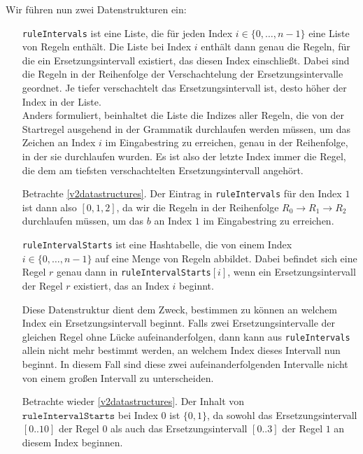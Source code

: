 Wir führen nun zwei Datenstrukturen ein: 
\begin{itemize}[leftmargin=10em]
	\item[\texttt{ruleIntervals}] ist eine Liste, die für jeden Index $i \in \{0, \dots, n - 1\}$ eine Liste von Regeln enthält. Die Liste bei Index $i$ enthält dann genau die Regeln, für die ein Ersetzungsintervall existiert, das diesen Index einschließt. Dabei sind die Regeln in der Reihenfolge der Verschachtelung der Ersetzungsintervalle geordnet. Je tiefer verschachtelt das Ersetzungsintervall ist, desto höher der Index in der Liste.\\ 
	Anders formuliert, beinhaltet die Liste die Indizes aller Regeln, die von der Startregel ausgehend in der Grammatik durchlaufen werden müssen, um das Zeichen an Index $i$ im Eingabestring zu erreichen, genau in der Reihenfolge, in der sie durchlaufen wurden. Es ist also der letzte Index immer die Regel, die dem am tiefsten verschachtelten Ersetzungsintervall angehört. 
	
	Betrachte \autoref{v2datastructures}. Der Eintrag in \texttt{ruleIntervals} für den Index $1$ ist dann also $[0, 1, 2]$, da wir die Regeln in der Reihenfolge $R_0 \rightarrow R_1 \rightarrow R_2$ durchlaufen müssen, um das $b$ an Index $1$ im Eingabestring zu erreichen.
	
	\item[\texttt{ruleIntervalStarts}] ist eine Hashtabelle, die von einem Index $i \in \{0, \dots, n - 1\}$ auf eine Menge von Regeln abbildet. Dabei befindet sich eine Regel $r$ genau dann in \texttt{ruleIntervalStarts}$[i]$, wenn ein Ersetzungsintervall der Regel $r$ existiert, das an Index $i$ beginnt.
	
	Diese Datenstruktur dient dem Zweck, bestimmen zu können an welchem Index ein Ersetzungsintervall beginnt. Falls zwei Ersetzungsintervalle der gleichen Regel ohne Lücke aufeinanderfolgen, dann kann aus \texttt{ruleIntervals} allein nicht mehr bestimmt werden, an welchem Index dieses Intervall nun beginnt. In diesem Fall sind diese zwei aufeinanderfolgenden Intervalle nicht von einem großen Intervall zu unterscheiden.

    Betrachte wieder \autoref{v2datastructures}. Der Inhalt von\\
    $\texttt{ruleIntervalStarts}$ bei Index $0$ ist $\{0, 1\}$, da sowohl das Ersetzungsintervall $[0..10]$ der Regel $0$ als auch das Ersetzungsintervall $[0..3]$ der Regel $1$ an diesem Index beginnen. 
\end{itemize}



